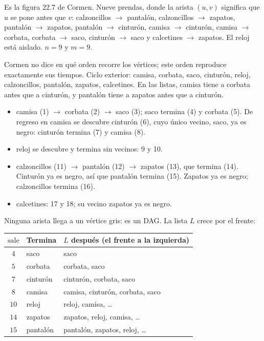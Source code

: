 \documentclass[11pt,letterpaper]{article}
\begin{document}
\begin{ejemplo}
  \label{ej:ropa-dfs}
  Es la figura 22.7 de Cormen. Nueve prendas, donde la arista $(u, v)$
  significa que $u$ se pone antes que $v$: calzoncillos $\to$
  pantalón, calzoncillos $\to$ zapatos, pantalón $\to$ zapatos,
  pantalón $\to$ cinturón, camisa $\to$ cinturón, camisa $\to$ corbata,
  corbata $\to$ saco, cinturón $\to$ saco y calcetines $\to$ zapatos.
  El reloj está aislado. $n = 9$ y $m = 9$.

  Cormen no dice en qué orden recorre los vértices; este orden
  reproduce exactamente sus tiempos. Ciclo exterior: camisa, corbata,
  saco, cinturón, reloj, calzoncillos, pantalón, zapatos, calcetines.
  En las listas, camisa tiene a corbata antes que a cinturón, y
  pantalón tiene a zapatos antes que a cinturón.
  \begin{itemize}[itemsep=0.1em]
    \item camisa (1) $\to$ corbata (2) $\to$ saco (3); saco termina (4)
          y corbata (5). De regreso en camisa se descubre cinturón (6),
          cuyo único vecino, saco, ya es negro: cinturón termina (7) y
          camisa (8).
    \item reloj se descubre y termina sin vecinos: 9 y 10.
    \item calzoncillos (11) $\to$ pantalón (12) $\to$ zapatos (13), que
          termina (14). Cinturón ya es negro, así que pantalón termina
          (15). Zapatos ya es negro; calzoncillos termina (16).
    \item calcetines: 17 y 18; su vecino zapatos ya es negro.
  \end{itemize}
  Ninguna arista llega a un vértice gris: es un DAG. La lista $L$
  crece por el frente:
  \begin{center}
  \small
  \begin{tabular}{cll}
    \toprule
    $\text{sale}$ & \textbf{Termina} & \textbf{$L$ después (el frente
      a la izquierda)} \\
    \midrule
    $4$ & saco & saco \\
    $5$ & corbata & corbata, saco \\
    $7$ & cinturón & cinturón, corbata, saco \\
    $8$ & camisa & camisa, cinturón, corbata, saco \\
    $10$ & reloj & reloj, camisa, \ldots \\
    $14$ & zapatos & zapatos, reloj, camisa, \ldots \\
    $15$ & pantalón & pantalón, zapatos, reloj, \ldots \\

\end{tabular}
\end{center}
\end{ejemplo}
\end{document}

